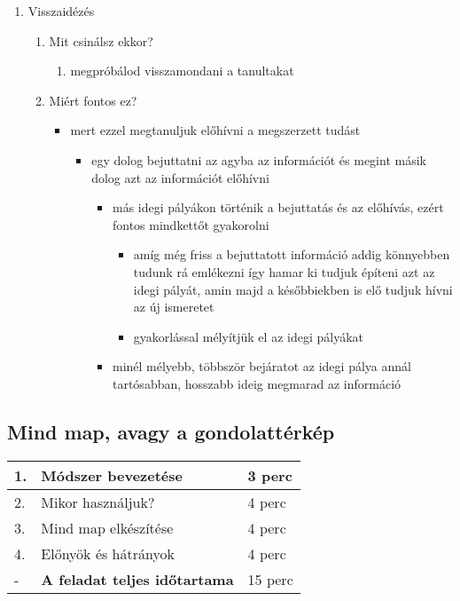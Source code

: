 \documentclass[../Main.tex]{subfiles}
\begin{document}
\begin{enumerate}
    \item Visszaidézés
    \begin{enumerate}
        \item Mit csinálsz ekkor?
        \begin{enumerate}
            \item megpróbálod visszamondani a tanultakat
        \end{enumerate}
        \item Miért fontos ez?
        \begin{itemize}
            \item mert ezzel megtanuljuk előhívni a megszerzett tudást
            \begin{itemize}
                \item egy dolog bejuttatni az agyba az információt és megint másik dolog azt az információt előhívni
                \begin{itemize}
                    \item más idegi pályákon történik a bejuttatás és az előhívás, ezért fontos mindkettőt gyakorolni
                    \begin{itemize}
                        \item amíg még friss a bejuttatott információ addig könnyebben tudunk rá emlékezni így hamar ki
                         tudjuk építeni azt az idegi pályát, amin majd a későbbiekben is elő tudjuk hívni az új ismeretet
                        \item gyakorlással mélyítjük el az idegi pályákat
                    \end{itemize}
                    \item minél mélyebb, többször bejáratot az idegi pálya annál tartósabban, hosszabb ideig megmarad az információ
                \end{itemize}
            \end{itemize}
        \end{itemize}
    \end{enumerate}
\end{enumerate}


\subsection{Mind map, avagy a gondolattérkép}

\begin{center}
    \begin{tabular}{| m{1.3 em} | m{} | m{} |}
    \hline
    1. & Módszer bevezetése & 3 perc \\
    \hline
    2. & Mikor használjuk? & 4 perc \\
    \hline
    3. & Mind map elkészítése & 4 perc \\
    \hline
    4. & Előnyök és hátrányok & 4 perc \\
    \hline
    - & \textbf{A feladat teljes időtartama} & 15 perc \\
    \hline
    \end{tabular}
\end{center}
\end{document}
